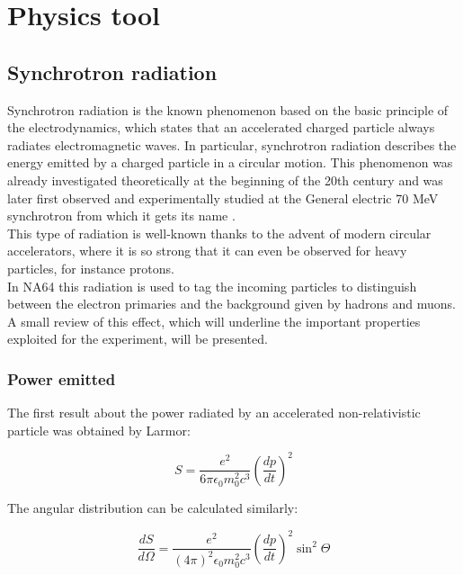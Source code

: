 
\newcommand{\appdirb}{appendices/plots/appendixB}

\chapter{Physics tool}

\label{AppendixB}

\section{Synchrotron radiation}
\label{appB:sec:sr}

Synchrotron radiation is the known phenomenon based on the basic principle of the electrodynamics, which states that an accelerated charged particle always radiates electromagnetic waves. In particular, synchrotron radiation describes the energy emitted by a charged particle in a circular motion. This phenomenon was already investigated theoretically at the beginning of the 20th century and was later first observed and experimentally studied at the General electric 70 MeV synchrotron from which it gets its name \cite{synchrotron-radiation}. \\
This type of radiation is well-known thanks to the advent of modern circular accelerators, where it is so strong that it can even be observed for heavy particles, for instance protons. \\
In NA64 this radiation is used to tag the incoming particles to distinguish between the electron primaries and the background given by hadrons and muons. A small review of this effect, which will underline the important properties exploited for the experiment, will be presented.


\subsection{Power emitted}
The first result about the power radiated by an accelerated non-relativistic particle was obtained by Larmor:

\begin{equation}
S = \frac{e^2}{6 \pi \epsilon_0 m_0^2 c^3}\left(\frac{dp}{dt}\right)^2
\label{eqn:radiated-power}
\end{equation}

The angular distribution can be calculated similarly:

\begin{equation}
\frac{dS}{d\Omega} = \frac{e^2}{(4 \pi)^2 \epsilon_0 m_0^2 c^3}\left(\frac{dp}{dt}\right)^2\sin^2\Theta
\label{eqn:angular-dist}
\end{equation}

